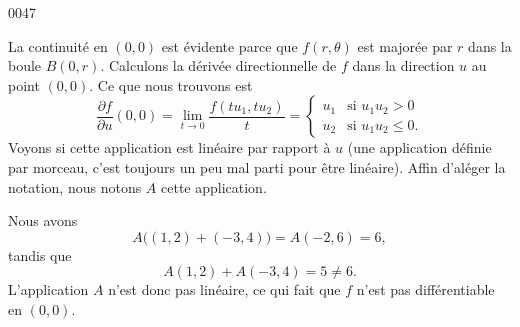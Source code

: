 
\begin{corrige}{0047}

La continuité en $(0,0)$ est évidente parce que $f(r,\theta)$ est majorée par $r$ dans la boule $B(0,r)$. Calculons la dérivée directionnelle de $f$ dans la direction $u$ au point $(0,0)$. Ce que nous trouvons est
\begin{equation}
	\frac{ \partial f }{ \partial u }(0,0)=\lim_{t\to 0}\frac{ f(tu_1,tu_2) }{ t }=
\begin{cases}
	u_1	&	\text{si $u_1u_2>0$}\\
	u_2	&	 \text{si $u_1u_2\leq 0$.}
\end{cases}
\end{equation}
Voyons si cette application est linéaire par rapport à $u$ (une application définie par morceau, c'est toujours un peu mal parti pour être linéaire). Affin d'aléger la notation, nous notons $A$ cette application.

Nous avons
\begin{equation}
	A\big( (1,2)+(-3,4) \big)=A(-2,6)=6,
\end{equation}
tandis que
\begin{equation}
	A(1,2)+A(-3,4)=5\neq 6.
\end{equation}
L'application $A$ n'est donc pas linéaire, ce qui fait que $f$ n'est pas différentiable en $(0,0)$.

\end{corrige}
